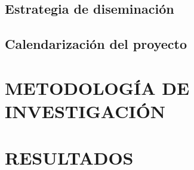 \documentclass[10pt, twocolumn]{article}
\begin{document}
\paragraph{}

\subsection{Estrategia de diseminación}
\paragraph{}

\subsection{Calendarización del proyecto}
\paragraph{}

\section{METODOLOGÍA DE INVESTIGACIÓN}
\paragraph{}

\section{RESULTADOS}
\paragraph{}
\end{document}
